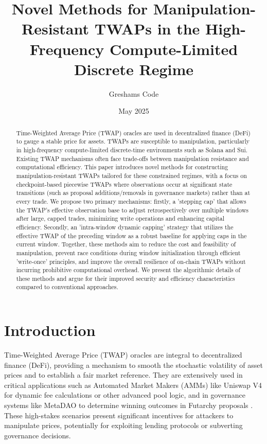\documentclass{article}
\title{Novel Methods for Manipulation-Resistant TWAPs in the High-Frequency Compute-Limited Discrete Regime}
\author[1]{Greshams Code}
\affil[1]{Founder, \href{https://govex.ai}{Govex.ai}}
\date{May 2025}
\begin{document}
\maketitle

\begin{abstract} 
Time-Weighted Average Price (TWAP) oracles are used in decentralized finance (DeFi) to gauge a stable price for assets. TWAPs are susceptible to manipulation, particularly in high-frequency compute-limited discrete-time environments such as Solana and Sui. Existing TWAP mechanisms often face trade-offs between manipulation resistance and computational efficiency. This paper introduces novel methods for constructing manipulation-resistant TWAPs tailored for these constrained regimes, with a focus on checkpoint-based piecewise TWAPs where observations occur at significant state transitions (such as proposal additions/removals in governance markets) rather than at every trade. We propose two primary mechanisms: firstly, a 'stepping cap' that allows the TWAP's effective observation base to adjust retrospectively over multiple windows after large, capped trades, minimizing write operations and enhancing capital efficiency. Secondly, an 'intra-window dynamic capping' strategy that utilizes the effective TWAP of the preceding window as a robust baseline for applying caps in the current window. Together, these methods aim to reduce the cost and feasibility of manipulation, prevent race conditions during window initialization through efficient 'write-once' principles, and improve the overall resilience of on-chain TWAPs without incurring prohibitive computational overhead. We present the algorithmic details of these methods and argue for their improved security and efficiency characteristics compared to conventional approaches.
\end{abstract}

\section{Introduction}
Time-Weighted Average Price (TWAP) oracles are integral to decentralized finance (DeFi), providing a mechanism to smooth the stochastic volatility of asset prices and to establish a fair market reference. They are extensively used in critical applications such as Automated Market Makers (AMMs) like Uniswap V4 for dynamic fee calculations or other advanced pool logic, and in governance systems like MetaDAO to determine winning outcomes in Futarchy proposals \cite{ammrs}. These high-stakes scenarios present significant incentives for attackers to manipulate prices, potentially for exploiting lending protocols or subverting governance decisions.
\end{document}
